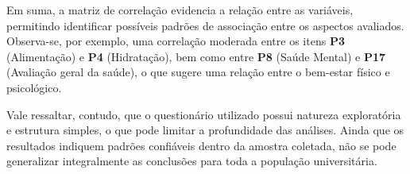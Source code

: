 Em suma, a matriz de correlação evidencia a relação entre as variáveis, permitindo identificar possíveis padrões de associação entre os aspectos avaliados. Observa-se, por exemplo, uma correlação moderada entre os itens \textbf{P3} (Alimentação) e \textbf{P4} (Hidratação), bem como entre \textbf{P8} (Saúde Mental) e \textbf{P17} (Avaliação geral da saúde), o que sugere uma relação entre o bem-estar físico e psicológico.

Vale ressaltar, contudo, que o questionário utilizado possui natureza exploratória e estrutura simples, o que pode limitar a profundidade das análises. Ainda que os resultados indiquem padrões confiáveis dentro da amostra coletada, não se pode generalizar integralmente as conclusões para toda a população universitária.
